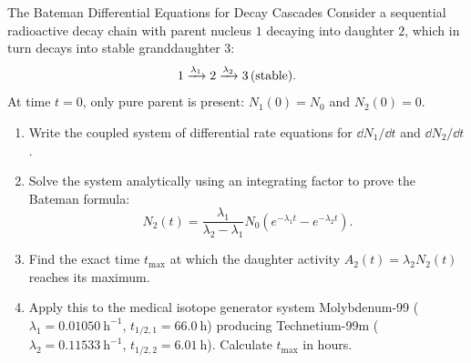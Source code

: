 \begin{exercise}{The Bateman Differential Equations for Decay Cascades}
Consider a sequential radioactive decay chain with parent nucleus $1$ decaying into daughter $2$, which in turn decays into stable granddaughter $3$:
\[
\ce{1} \xrightarrow{\lambda_1} \ce{2} \xrightarrow{\lambda_2} \ce{3 (stable)}.
\]
At time $t = 0$, only pure parent is present: $N_1(0) = N_0$ and $N_2(0) = 0$.
\begin{enumerate}[leftmargin=1.5em,itemsep=2pt]
  \item Write the coupled system of differential rate equations for $\dd N_1 / \dd t$ and $\dd N_2 / \dd t$.
  \item Solve the system analytically using an integrating factor to prove the Bateman formula:
  \[
  N_2(t) = \frac{\lambda_1}{\lambda_2 - \lambda_1} N_0 \left( e^{-\lambda_1 t} - e^{-\lambda_2 t} \right).
  \]
  \item Find the exact time $t_{\max}$ at which the daughter activity $A_2(t) = \lambda_2 N_2(t)$ reaches its maximum.
  \item Apply this to the medical isotope generator system Molybdenum-99 ($\lambda_1 = 0.01050\ \mathrm{h^{-1}}$, $t_{1/2,1} = 66.0\ \mathrm{h}$) producing Technetium-99m ($\lambda_2 = 0.11533\ \mathrm{h^{-1}}$, $t_{1/2,2} = 6.01\ \mathrm{h}$). Calculate $t_{\max}$ in hours.
\end{enumerate}
\end{exercise}

\begin{tabletworkspace}[5.0cm]
\end{tabletworkspace}

